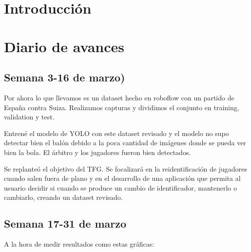 \documentclass[12pt, a4paper, twoside]{article}
\begin{document}
	
	
	
	\clearpage
	\setcounter{page}{1}
	
	
	
	\tableofcontents
	\newpage
	
	
	\section{Introducción}
	
	\section{Diario de avances}
	
	\subsection{Semana 3-16 de marzo)}
	
	Por ahora lo que llevamos es un dataset hecho en roboflow con un partido de España contra Suiza. Realizamos capturas y dividimos el conjunto en training, validation y test.
	
	Entrené el modelo de YOLO con este dataset revisado y el modelo no supo detectar bien el balón debido a la poca cantidad de imágenes donde se pueda ver bien la bola. El árbitro y los jugadores fueron bien detectados.
	
	Se replanteó el objetivo del TFG. Se focalizará en la reidentificación de jugadores cuando salen fuera de plano y en el desarrollo de una aplicación que permita al usuario decidir si cuando se produce un cambio de identificador, mantenerlo o cambiarlo, creando un dataset revisado.
	
	\subsection{Semana 17-31 de marzo \cite{sun2024gta}}
	
	A la hora de medir resultados como estas gráficas:
	
\end{document}
